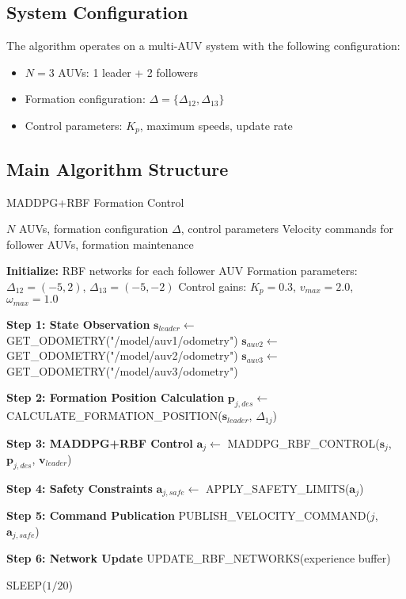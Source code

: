 \documentclass[11pt,a4paper]{article}
\newcommand{\vect}[1]{\boldsymbol{#1}}
\begin{document}
\subsection{System Configuration}

The algorithm operates on a multi-AUV system with the following configuration:
\begin{itemize}
    \item $N = 3$ AUVs: 1 leader + 2 followers
    \item Formation configuration: $\Delta = \{\Delta_{12}, \Delta_{13}\}$
    \item Control parameters: $K_p$, maximum speeds, update rate
\end{itemize}

\subsection{Main Algorithm Structure}

\begin{algorithm}[H]
\caption{MADDPG+RBF Formation Control}
\label{alg:main}
\begin{algorithmic}[1]
\Require $N$ AUVs, formation configuration $\Delta$, control parameters
\Ensure Velocity commands for follower AUVs, formation maintenance

\State \textbf{Initialize:}
\State \quad RBF networks for each follower AUV
\State \quad Formation parameters: $\Delta_{12} = (-5, 2)$, $\Delta_{13} = (-5, -2)$
\State \quad Control gains: $K_p = 0.3$, $v_{max} = 2.0$, $\omega_{max} = 1.0$

    \State \textbf{Step 1: State Observation}
    \State $\vect{s}_{leader} \leftarrow$ GET\_ODOMETRY("/model/auv1/odometry")
    \State $\vect{s}_{auv2} \leftarrow$ GET\_ODOMETRY("/model/auv2/odometry")
    \State $\vect{s}_{auv3} \leftarrow$ GET\_ODOMETRY("/model/auv3/odometry")
    
        \State \textbf{Step 2: Formation Position Calculation}
        \State $\vect{p}_{j,des} \leftarrow$ CALCULATE\_FORMATION\_POSITION($\vect{s}_{leader}$, $\Delta_{1j}$)
        
        \State \textbf{Step 3: MADDPG+RBF Control}
        \State $\vect{a}_j \leftarrow$ MADDPG\_RBF\_CONTROL($\vect{s}_j$, $\vect{p}_{j,des}$, $\vect{v}_{leader}$)
        
        \State \textbf{Step 4: Safety Constraints}
        \State $\vect{a}_{j,safe} \leftarrow$ APPLY\_SAFETY\_LIMITS($\vect{a}_j$)
        
        \State \textbf{Step 5: Command Publication}
        \State PUBLISH\_VELOCITY\_COMMAND($j$, $\vect{a}_{j,safe}$)
    \EndFor
    
    \State \textbf{Step 6: Network Update}
    \State UPDATE\_RBF\_NETWORKS(experience buffer)
    
    \State SLEEP($1/20$) 
\EndWhile
\end{algorithmic}
\end{algorithm}
\end{document}
